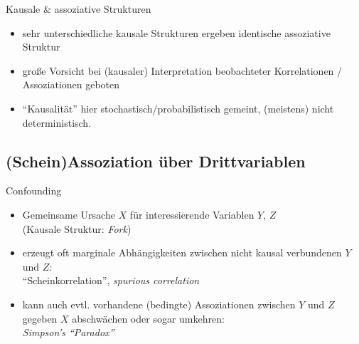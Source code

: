 \documentclass[
  10pt,
  ignorenonframetext,
]{beamer}
\providecommand{\tightlist}{%
  \setlength{\itemsep}{0pt}\setlength{\parskip}{0pt}}
\begin{document}
\begin{frame}{Kausale \& assoziative Strukturen}
\label{kausale-assoziative-strukturen-4}
\begin{itemize}
\tightlist
\item
  sehr unterschiedliche kausale Strukturen ergeben identische
  assoziative Struktur
\item
  große Vorsicht bei (kausaler) Interpretation beobachteter
  Korrelationen / Assoziationen geboten
\item
  ``Kausalität'' hier stochastisch/probabilistisch gemeint, (meistens)
  nicht deterministisch.
\end{itemize}
\end{frame}

\subsection{(Schein)Assoziation über
Drittvariablen}\label{scheinassoziation-uxfcber-drittvariablen}

\begin{frame}{Confounding}
\label{confounding}
\begin{itemize}
\item
  Gemeinsame Ursache \(X\) für interessierende Variablen \(Y\), \(Z\)\\
  (Kausale Struktur: \emph{Fork})
\item
  erzeugt oft marginale Abhängigkeiten zwischen nicht kausal verbundenen
  \(Y\) und \(Z\):\\
  ``Scheinkorrelation'', \emph{spurious correlation}
\item
  kann auch evtl. vorhandene (bedingte) Assoziationen zwischen \(Y\) und
  \(Z\) gegeben \(X\) abschwächen oder sogar umkehren:\\
  \emph{Simpson's ``Paradox''}
\end{itemize}
\end{frame}
\end{document}
